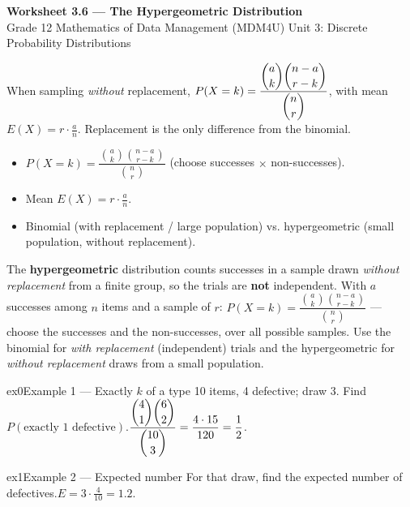 \documentclass[11pt]{article}
\begin{document}
\begin{center}
{\LARGE\bfseries\color{titleblue}Worksheet 3.6 --- The Hypergeometric Distribution}\\[2pt]
{\small Grade 12 Mathematics of Data Management (MDM4U) \textperiodcentered{} Unit 3: Discrete Probability Distributions}
\end{center}

\begin{ideabox}
When sampling \emph{without} replacement, $P(X=k)=\dfrac{\dbinom{a}{k}\dbinom{n-a}{r-k}}{\dbinom{n}{r}}$, with mean $E(X)=r\cdot\tfrac{a}{n}$. Replacement is the only difference from the binomial.
\begin{itemize}[leftmargin=*,itemsep=2pt]
  \item $P(X=k)=\dfrac{\binom{a}{k}\binom{n-a}{r-k}}{\binom{n}{r}}$ (choose successes $\times$ non-successes).
  \item Mean $E(X)=r\cdot\tfrac{a}{n}$.
  \item Binomial (with replacement / large population) vs. hypergeometric (small population, without replacement).
\end{itemize}
\end{ideabox}

\begin{learnbox}
The \textbf{hypergeometric} distribution counts successes in a sample drawn \emph{without replacement} from a finite group, so the trials are \textbf{not} independent.
With $a$ successes among $n$ items and a sample of $r$: $P(X=k)=\dfrac{\binom{a}{k}\binom{n-a}{r-k}}{\binom{n}{r}}$ — choose the successes and the non-successes, over all possible samples.
Use the binomial for \emph{with replacement} (independent) trials and the hypergeometric for \emph{without replacement} draws from a small population.
\end{learnbox}


\begin{example}{ex0}{Example 1 --- Exactly $k$ of a type}
10 items, 4 defective; draw 3. Find $P(\text{exactly 1 defective})$.\soln $\dfrac{\dbinom{4}{1}\dbinom{6}{2}}{\dbinom{10}{3}}=\dfrac{4\cdot15}{120}=\dfrac12$.
\end{example}

\begin{example}{ex1}{Example 2 --- Expected number}
For that draw, find the expected number of defectives.\soln $E=3\cdot\tfrac{4}{10}=1.2$.
\end{example}
\end{document}
